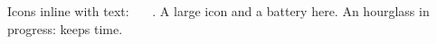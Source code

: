 \documentclass{article}
\begin{document}
Icons inline with text: \faAdjust\ \faAnchor\ \faAndroid\ \faAmbulance.
A large icon {\Large\faAmazon} and a battery \faBattery[2] here.
An hourglass in progress: \faHourglass[start] keeps time.
\end{document}
